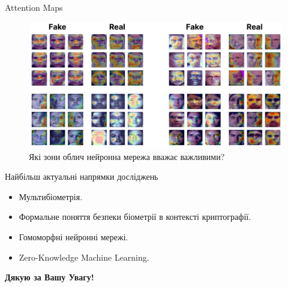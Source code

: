 \documentclass{zkdl-presentation-template}
\begin{document}
    \begin{frame}{Attention Maps}
        \begin{figure}
        \centering
            \includegraphics[width=\textwidth]{images/maps.png}
            \caption{Які зони облич нейронна мережа вважає важливими?}
        \end{figure}
    \end{frame}

    \begin{frame}{Найбільш актуальні напрямки досліджень}
        \begin{itemize}
            \item Мультибіометрія.
            \item Формальне поняття безпеки біометрії в контексті криптографії.
            \item Гомоморфні нейронні мережі.
            \item Zero-Knowledge Machine Learning.
        \end{itemize}
    \end{frame}
    
    \begin{frame}
        \centering
        \LARGE
        \textbf{Дякую за Вашу Увагу!} \\
        
        \vspace{0.2cm} \Huge {} \large \\
    \end{frame}
\end{document}
